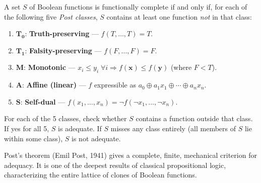 \begin{tcolorbox}[colback=thmbox, colframe=thmborder, arc=2pt,
  left=6pt, right=6pt, top=4pt, bottom=4pt,
  title={\small\textbf{Theorem (Post's Functional Completeness Theorem)}},
  fonttitle=\small\bfseries]
\label{thm:post}
A set $S$ of Boolean functions is functionally complete if and only if, for
each of the following five \emph{Post classes}, $S$ contains at least one
function \emph{not} in that class:
\begin{enumerate}
  \item $\mathbf{T_0}$: \textbf{Truth-preserving} — $f(T,\ldots,T)=T$.
  \item $\mathbf{T_1}$: \textbf{Falsity-preserving} — $f(F,\ldots,F)=F$.
  \item $\mathbf{M}$: \textbf{Monotonic} — $x_i \leq y_i\;\forall i \Rightarrow f(\mathbf{x}) \leq f(\mathbf{y})$ (where $F<T$).
  \item $\mathbf{A}$: \textbf{Affine (linear)} — $f$ expressible as $a_0 \oplus a_1 x_1 \oplus \cdots \oplus a_n x_n$.
  \item $\mathbf{S}$: \textbf{Self-dual} — $f(x_1,\ldots,x_n) = \neg f(\neg x_1,\ldots,\neg x_n)$.
\end{enumerate}
\end{tcolorbox}

\begin{remark}
For each of the 5 classes, check whether $S$ contains a function outside that
class. If yes for all 5, $S$ is adequate. If $S$ misses any class entirely
(all members of $S$ lie within some class), $S$ is not adequate.
\end{remark}

\begin{remark}
Post's theorem (Emil Post, 1941) gives a complete, finite, mechanical criterion
for adequacy. It is one of the deepest results of classical propositional logic,
characterizing the entire lattice of clones of Boolean functions.
\end{remark}


